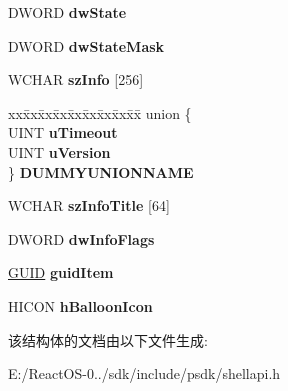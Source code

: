 \begin{DoxyCompactItemize}
D\+W\+O\+RD {\bfseries dw\+State}
\item 
\mbox{\label{struct___n_o_t_i_f_y_i_c_o_n_d_a_t_a_w_ade24afc1acdd90bd00d7fd778a0a0dfa}} 
D\+W\+O\+RD {\bfseries dw\+State\+Mask}
\item 
\mbox{\label{struct___n_o_t_i_f_y_i_c_o_n_d_a_t_a_w_af432473224988c0733ea255f796af58a}} 
W\+C\+H\+AR {\bfseries sz\+Info} \mbox{[}256\mbox{]}
\item 
\mbox{\label{struct___n_o_t_i_f_y_i_c_o_n_d_a_t_a_w_a38c713f42d138af201df807b55df49b4}} 
\begin{tabbing}
xx\=xx\=xx\=xx\=xx\=xx\=xx\=xx\=xx\=\kill
union \{\\
\>UINT {\bfseries uTimeout}\\
\>UINT {\bfseries uVersion}\\
\} {\bfseries DUMMYUNIONNAME}\\

\end{tabbing}\item 
\mbox{\label{struct___n_o_t_i_f_y_i_c_o_n_d_a_t_a_w_a554c95a861f0fa8114d0d44cfa77ba36}} 
W\+C\+H\+AR {\bfseries sz\+Info\+Title} \mbox{[}64\mbox{]}
\item 
\mbox{\label{struct___n_o_t_i_f_y_i_c_o_n_d_a_t_a_w_a0ce43ab80343aaf9d75fe8c7189ffc43}} 
D\+W\+O\+RD {\bfseries dw\+Info\+Flags}
\item 
\mbox{\label{struct___n_o_t_i_f_y_i_c_o_n_d_a_t_a_w_aebbd2a205c50fc8f79eac33ad8db66d8}} 
\hyperlink{interface_g_u_i_d}{G\+U\+ID} {\bfseries guid\+Item}
\item 
\mbox{\label{struct___n_o_t_i_f_y_i_c_o_n_d_a_t_a_w_a9fdad24b4411f47fb189c9c31fe6418f}} 
H\+I\+C\+ON {\bfseries h\+Balloon\+Icon}
\end{DoxyCompactItemize}


该结构体的文档由以下文件生成\+:\begin{DoxyCompactItemize}
\item 
E\+:/\+React\+O\+S-\/0../sdk/include/psdk/shellapi.\+h\end{DoxyCompactItemize}
